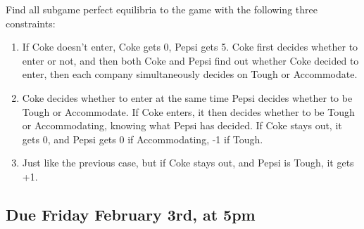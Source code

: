 \documentclass[
  11pt,
]{article}
\providecommand{\tightlist}{%
  \setlength{\itemsep}{0pt}\setlength{\parskip}{0pt}}
\begin{document}
Find all subgame perfect equilibria to the game with the following three
constraints:

\begin{enumerate}
\def\labelenumi{\arabic{enumi}.}
\tightlist
\item
  If Coke doesn't enter, Coke gets 0, Pepsi gets 5. Coke first decides
  whether to enter or not, and then both Coke and Pepsi find out whether
  Coke decided to enter, then each company simultaneously decides on
  Tough or Accommodate.
\item
  Coke decides whether to enter at the same time Pepsi decides whether
  to be Tough or Accommodate. If Coke enters, it then decides whether to
  be Tough or Accommodating, knowing what Pepsi has decided. If Coke
  stays out, it gets 0, and Pepsi gets 0 if Accommodating, -1 if Tough.
\item
  Just like the previous case, but if Coke stays out, and Pepsi is
  Tough, it gets +1.
\end{enumerate}

\hypertarget{due-friday-february-3rd-at-5pm}{%
\subsection{Due Friday February 3rd, at
5pm}\label{due-friday-february-3rd-at-5pm}}
\end{document}
